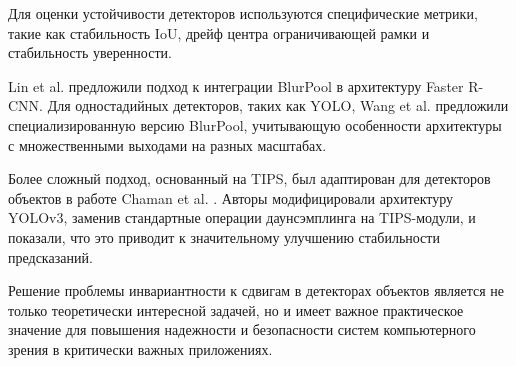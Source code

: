 Для оценки устойчивости детекторов используются специфические метрики, такие как стабильность IoU, дрейф центра ограничивающей рамки и стабильность уверенности.

Lin et al. \cite{Lin2020} предложили подход к интеграции BlurPool в архитектуру Faster R-CNN. Для одностадийных детекторов, таких как YOLO, Wang et al. \cite{Wang2020} предложили специализированную версию BlurPool, учитывающую особенности архитектуры с множественными выходами на разных масштабах.

Более сложный подход, основанный на TIPS, был адаптирован для детекторов объектов в работе Chaman et al. \cite{Chaman2022}. Авторы модифицировали архитектуру YOLOv3, заменив стандартные операции даунсэмплинга на TIPS-модули, и показали, что это приводит к значительному улучшению стабильности предсказаний.

Решение проблемы инвариантности к сдвигам в детекторах объектов является не только теоретически интересной задачей, но и имеет важное практическое значение для повышения надежности и безопасности систем компьютерного зрения в критически важных приложениях. 